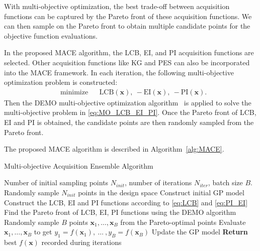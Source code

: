 With multi-objective optimization, the best trade-off between acquisition functions can be captured by the Pareto front of these acquisition functions. We can then sample on the Pareto front to obtain multiple candidate points for the objective function evaluations.

In the proposed MACE algorithm, the LCB, EI, and PI acquisition functions are selected. Other acquisition functions like KG and PES can also be incorporated into the MACE framework. In each iteration, the following multi-objective optimization problem is constructed:
\begin{equation}
    \label{eq:MO_LCB_EI_PI}
    \begin{aligned}
        & \text{minimize} & & \mathrm{LCB}(\bm{x}),~-\mathrm{EI}(\bm{x}),~-\mathrm{PI}(\bm{x}).
    \end{aligned}
\end{equation}
Then the DEMO multi-objective optimization algorithm~\cite{demo} is applied to solve the multi-objective problem in \eqref{eq:MO_LCB_EI_PI}. Once the Pareto front of LCB, EI and PI is obtained, the candidate points are then randomly sampled from the Pareto front.


The proposed MACE algorithm is described in Algorithm~\ref{alg:MACE}.

\begin{algorithm}
    \caption{Multi-objective Acquisition Ensemble Algorithm}
    \label{alg:MACE}
    \begin{algorithmic}[1]
        \REQUIRE Number of initial sampling points $N_{init}$, number of iterations $N_{iter}$, batch size $B$.
        \STATE Randomly sample $N_{init}$ points in the design space
        \STATE Construct initial GP model
        \STATE Construct the LCB, EI and PI functions according to \eqref{eq:LCB} and \eqref{eq:PI_EI}
        \STATE Find the Pareto front of LCB, EI, PI functions using the DEMO algorithm
        \STATE Randomly sample $B$ points $\bm{x}_1, \dots, \bm{x}_B$ from the Pareto-optimal points
        \STATE Evaluate $\bm{x}_1, \dots, \bm{x}_B$ to get $y_1 = f(\bm{x}_1),~\dots~,y_B = f(\bm{x}_B)$
        \STATE Update the GP model
        \ENDFOR
        \STATE \textbf{Return} best $f(\bm{x})$ recorded during iterations
    \end{algorithmic}
\end{algorithm}


